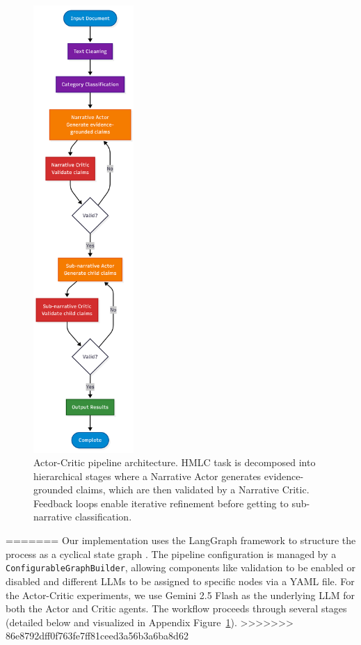 \begin{figure}[!ht]
\centering
\includegraphics[height=17cm]{assets/diagrams/actor-critique.png}
\caption{Actor-Critic pipeline architecture. HMLC task is decomposed into hierarchical stages where a Narrative Actor generates evidence-grounded claims, which are then validated by a Narrative Critic. Feedback loops enable iterative refinement before getting to sub-narrative classification.}
\label{fig:actor_critic_pipeline}
\end{figure}
=======
Our implementation uses the LangGraph framework to structure the process as a cyclical state graph \citep{langgraph2024}. The pipeline configuration is managed by a \texttt{ConfigurableGraphBuilder}, allowing components like validation to be enabled or disabled and different LLMs to be assigned to specific nodes via a YAML file. For the Actor-Critic experiments, we use Gemini 2.5 Flash as the underlying LLM for both the Actor and Critic agents. The workflow proceeds through several stages (detailed below and visualized in Appendix Figure~\ref{fig:actor_critic_pipeline}).
>>>>>>> 86e8792dff0f763fe7ff81ceed3a56b3a6ba8d62

